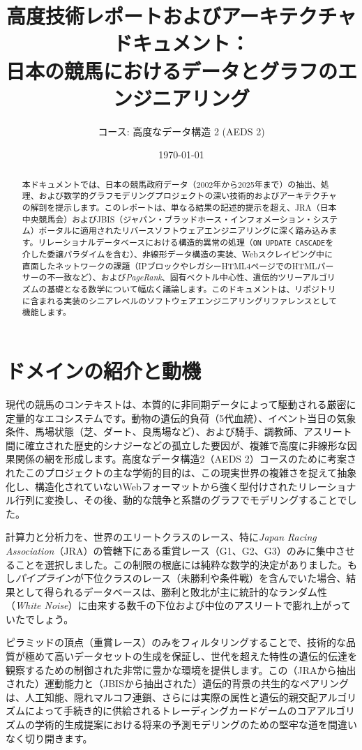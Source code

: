 \documentclass[12pt,a4paper]{article}
\title{\textbf{高度技術レポートおよびアーキテクチャドキュメント：\\日本の競馬におけるデータとグラフのエンジニアリング}}
\author{コース: 高度なデータ構造 2 (AEDS 2)}
\date{\today}
\begin{document}
\maketitle
\tableofcontents
\newpage

\begin{abstract}
本ドキュメントでは、日本の競馬政府データ（2002年から2025年まで）の抽出、処理、および数学的グラフモデリングプロジェクトの深い技術的およびアーキテクチャの解剖を提示します。このレポートは、単なる結果の記述的提示を超え、JRA（日本中央競馬会）およびJBIS（ジャパン・ブラッドホース・インフォメーション・システム）ポータルに適用されたリバースソフトウェアエンジニアリングに深く踏み込みます。リレーショナルデータベースにおける構造的異常の処理（\texttt{ON UPDATE CASCADE}を介した委譲パラダイムを含む）、非線形データ構造の実装、Webスクレイピング中に直面したネットワークの課題（IPブロックやレガシーHTML4ページでのHTMLパーサーの不一致など）、および\textit{PageRank}、固有ベクトル中心性、遺伝的ツリーアルゴリズムの基礎となる数学について幅広く議論します。このドキュメントは、リポジトリに含まれる実装のシニアレベルのソフトウェアエンジニアリングリファレンスとして機能します。
\end{abstract}

\section{ドメインの紹介と動機}
現代の競馬のコンテキストは、本質的に非同期データによって駆動される厳密に定量的なエコシステムです。動物の遺伝的負荷（5代血統）、イベント当日の気象条件、馬場状態（芝、ダート、良馬場など）、および騎手、調教師、アスリート間に確立された歴史的シナジーなどの孤立した要因が、複雑で高度に非線形な因果関係の網を形成します。高度なデータ構造2（AEDS 2）コースのために考案されたこのプロジェクトの主な学術的目的は、この現実世界の複雑さを捉えて抽象化し、構造化されていないWebフォーマットから強く型付けされたリレーショナル行列に変換し、その後、動的な競争と系譜のグラフでモデリングすることでした。

計算力と分析力を、世界のエリートクラスのレース、特に\textit{Japan Racing Association}（JRA）の管轄下にある重賞レース（G1、G2、G3）のみに集中させることを選択しました。この制限の根底には純粋な数学的決定がありました。もし\textit{パイプライン}が下位クラスのレース（未勝利や条件戦）を含んでいた場合、結果として得られるデータベースは、勝利と敗北が主に統計的なランダム性（\textit{White Noise}）に由来する数千の下位および中位のアスリートで膨れ上がっていたでしょう。

ピラミッドの頂点（重賞レース）のみをフィルタリングすることで、技術的な品質が極めて高いデータセットの生成を保証し、世代を超えた特性の遺伝的伝達を観察するための制御された非常に豊かな環境を提供します。この（JRAから抽出された）運動能力と（JBISから抽出された）遺伝的背景の共生的なペアリングは、人工知能、隠れマルコフ連鎖、さらには実際の属性と遺伝的親交配アルゴリズムによって手続き的に供給されるトレーディングカードゲームのコアアルゴリズムの学術的生成提案における将来の予測モデリングのための堅牢な道を間違いなく切り開きます。
\end{document}
